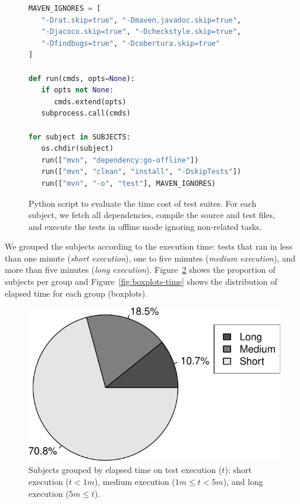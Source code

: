 \begin{figure}[h!]
\centering
\scriptsize
{}
\begin{lstlisting}[language=Python]
MAVEN_IGNORES = [
   "-Drat.skip=true", "-Dmaven.javadoc.skip=true",
   "-Djacoco.skip=true", "-Dcheckstyle.skip=true",
   "-Dfindbugs=true", "-Dcobertura.skip=true"
]

def run(cmds, opts=None):
   if opts not None:
      cmds.extend(opts)
   subprocess.call(cmds)

for subject in SUBJECTS:
   os.chdir(subject)
   run(["mvn", "dependency:go-offline"])
   run(["mvn", "clean", "install", "-DskipTests"])
   run(["mvn", "-o", "test"], MAVEN_IGNORES)
\end{lstlisting}
\caption{\label{fig:mvn-execution} Python script to evaluate the
    time cost of test suites. For each subject, we fetch all
    dependencies, compile the source and test files, and execute the
    tests in offline mode ignoring non-related tasks.}
\end{figure}

We grouped the subjects according to the execution time: tests that
ran in less than one minute (\emph{short execution}), one to five
minutes (\emph{medium execution}), and more than five minutes
(\emph{long execution}). Figure~\ref{fig:piechart-time} shows the
proportion of subjects per group and Figure~\ref{fig:boxplots-time}
shows the distribution of elapsed time for each group (boxplots). 

\begin{figure}[h!]
    \centering
    \begin{minipage}{2in}%
    \includegraphics[width=\textwidth]{plots/piechart-timecost.pdf}
    \end{minipage}%
    \caption{\label{fig:piechart-time} Subjects grouped by elapsed time on test
    execution ($t$): short execution ($t < 1m$), medium execution ($1m \leq t <
    5m$), and long execution ($5m \leq t$).}
\end{figure}

